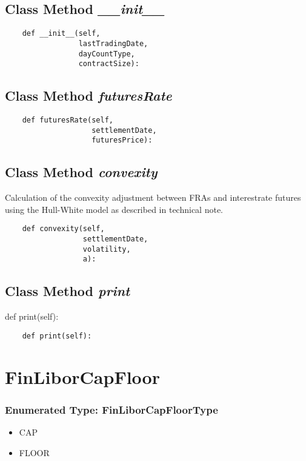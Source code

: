 \documentclass[twoside,11pt]{book}
\begin{document}
\subsection{Class Method {\it \_\_init\_\_}}


\begin{lstlisting}
    def __init__(self,
                 lastTradingDate,
                 dayCountType,
                 contractSize):
\end{lstlisting}

\subsection{Class Method {\it futuresRate}}


\begin{lstlisting}
    def futuresRate(self,
                    settlementDate,
                    futuresPrice):
\end{lstlisting}

\subsection{Class Method {\it convexity}}
Calculation of the convexity adjustment between FRAs and interestrate futures using the Hull-White model as described in technical note. 

\begin{lstlisting}
    def convexity(self,
                  settlementDate,
                  volatility,
                  a):
\end{lstlisting}

\subsection{Class Method {\it print}}
def print(self):

\begin{lstlisting}
    def print(self):
\end{lstlisting}

\newpage
\section{FinLiborCapFloor}

\subsubsection{Enumerated Type: FinLiborCapFloorType}
\begin{itemize}
\item{CAP}
\item{FLOOR}
\end{itemize}
\end{document}
